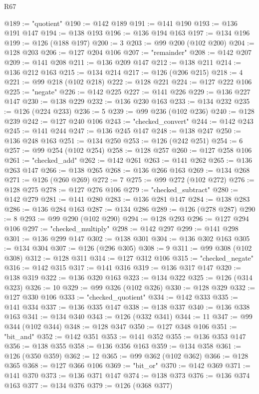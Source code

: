 \begin{lexlean}{R67}
\begin{coremodule}
@189 := "quotient"
@190 := @142 @189
@191 := @141 @190
@193 := @136 @191 @147
@194 := @138 @193
@196 := @136 @194 @163
@197 := @134 @196
@199 := @126 (@188 @197)
@200 := 3
@203 := @99 @200 (@102 @200)
@204 := @128 @203
@206 := @127 @204 @106
@207 := "remainder"
@208 := @142 @207
@209 := @141 @208
@211 := @136 @209 @147
@212 := @138 @211
@214 := @136 @212 @163
@215 := @134 @214
@217 := @126 (@206 @215)
@218 := 4
@221 := @99 @218 (@102 @218)
@222 := @128 @221
@224 := @127 @222 @106
@225 := "negate"
@226 := @142 @225
@227 := @141 @226
@229 := @136 @227 @147
@230 := @138 @229
@232 := @136 @230 @163
@233 := @134 @232
@235 := @126 (@224 @233)
@236 := 5
@239 := @99 @236 (@102 @236)
@240 := @128 @239
@242 := @127 @240 @106
@243 := "checked_convert"
@244 := @142 @243
@245 := @141 @244
@247 := @136 @245 @147
@248 := @138 @247
@250 := @136 @248 @163
@251 := @134 @250
@253 := @126 (@242 @251)
@254 := 6
@257 := @99 @254 (@102 @254)
@258 := @128 @257
@260 := @127 @258 @106
@261 := "checked_add"
@262 := @142 @261
@263 := @141 @262
@265 := @136 @263 @147
@266 := @138 @265
@268 := @136 @266 @163
@269 := @134 @268
@271 := @126 (@260 @269)
@272 := 7
@275 := @99 @272 (@102 @272)
@276 := @128 @275
@278 := @127 @276 @106
@279 := "checked_subtract"
@280 := @142 @279
@281 := @141 @280
@283 := @136 @281 @147
@284 := @138 @283
@286 := @136 @284 @163
@287 := @134 @286
@289 := @126 (@278 @287)
@290 := 8
@293 := @99 @290 (@102 @290)
@294 := @128 @293
@296 := @127 @294 @106
@297 := "checked_multiply"
@298 := @142 @297
@299 := @141 @298
@301 := @136 @299 @147
@302 := @138 @301
@304 := @136 @302 @163
@305 := @134 @304
@307 := @126 (@296 @305)
@308 := 9
@311 := @99 @308 (@102 @308)
@312 := @128 @311
@314 := @127 @312 @106
@315 := "checked_negate"
@316 := @142 @315
@317 := @141 @316
@319 := @136 @317 @147
@320 := @138 @319
@322 := @136 @320 @163
@323 := @134 @322
@325 := @126 (@314 @323)
@326 := 10
@329 := @99 @326 (@102 @326)
@330 := @128 @329
@332 := @127 @330 @106
@333 := "checked_quotient"
@334 := @142 @333
@335 := @141 @334
@337 := @136 @335 @147
@338 := @138 @337
@340 := @136 @338 @163
@341 := @134 @340
@343 := @126 (@332 @341)
@344 := 11
@347 := @99 @344 (@102 @344)
@348 := @128 @347
@350 := @127 @348 @106
@351 := "bit_and"
@352 := @142 @351
@353 := @141 @352
@355 := @136 @353 @147
@356 := @138 @355
@358 := @136 @356 @163
@359 := @134 @358
@361 := @126 (@350 @359)
@362 := 12
@365 := @99 @362 (@102 @362)
@366 := @128 @365
@368 := @127 @366 @106
@369 := "bit_or"
@370 := @142 @369
@371 := @141 @370
@373 := @136 @371 @147
@374 := @138 @373
@376 := @136 @374 @163
@377 := @134 @376
@379 := @126 (@368 @377)

\end{coremodule}
\end{lexlean}
